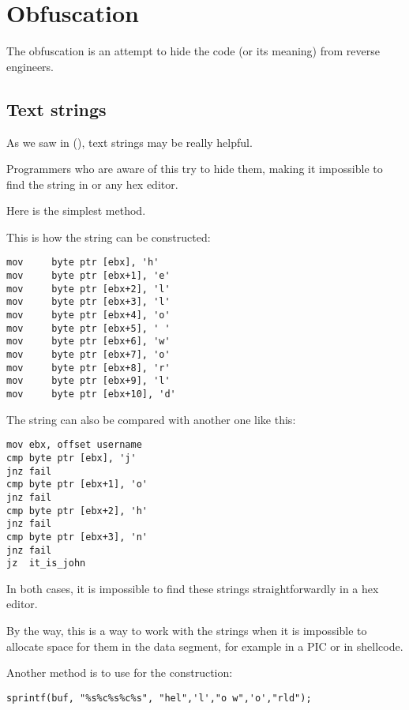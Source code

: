 \section{Obfuscation}

The obfuscation is an attempt to hide the code (or its meaning) from reverse engineers.

\subsection{Text strings}

As we saw in (), text strings may be really helpful.

Programmers who are aware of this try to hide them, making it impossible to find the string in \IDA{} or any hex editor.

Here is the simplest method.

This is how the string can be constructed:

\begin{lstlisting}[style=customasm]
mov     byte ptr [ebx], 'h'
mov     byte ptr [ebx+1], 'e'
mov     byte ptr [ebx+2], 'l'
mov     byte ptr [ebx+3], 'l'
mov     byte ptr [ebx+4], 'o'
mov     byte ptr [ebx+5], ' '
mov     byte ptr [ebx+6], 'w'
mov     byte ptr [ebx+7], 'o'
mov     byte ptr [ebx+8], 'r'
mov     byte ptr [ebx+9], 'l'
mov     byte ptr [ebx+10], 'd'
\end{lstlisting}

The string can also be compared with another one like this:

\begin{lstlisting}[style=customasm]
mov	ebx, offset username
cmp	byte ptr [ebx], 'j'
jnz	fail
cmp	byte ptr [ebx+1], 'o'
jnz	fail
cmp	byte ptr [ebx+2], 'h'
jnz	fail
cmp	byte ptr [ebx+3], 'n'
jnz	fail
jz	it_is_john
\end{lstlisting}

In both cases, it is impossible to find these strings straightforwardly in a hex editor.


By the way, this is a way to work with the strings when it is impossible
to allocate space for them in the data segment, for example in a \ac{PIC} or in shellcode.

Another method is to use  
for the construction:

\begin{lstlisting}[style=customc]
sprintf(buf, "%s%c%s%c%s", "hel",'l',"o w",'o',"rld");
\end{lstlisting}

